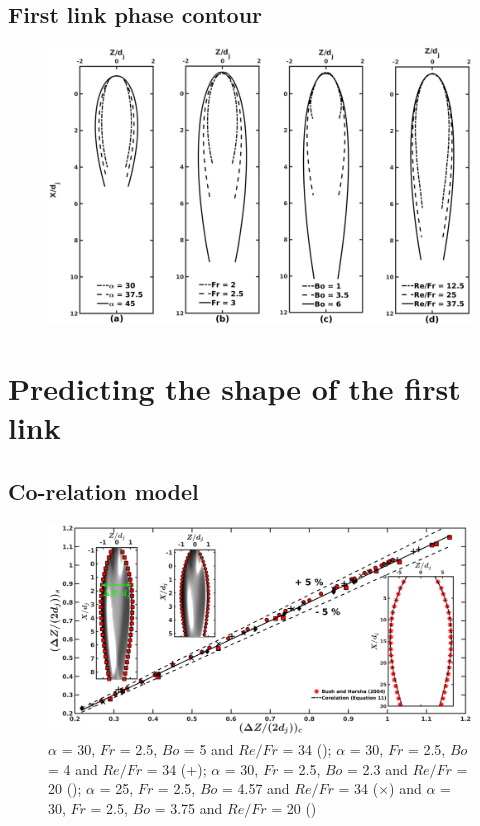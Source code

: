 \documentclass[%
aip,
sd,%
amsmath,amssymb,
preprint,%
author-year,%
]{revtex4-1}
\begin{document}
\subsection{First link phase contour}
\begin{figure}
	\centering
	\includegraphics[width=\linewidth]{finalContour}
	\caption{}
	\label{Figure::finalContours}
\end{figure}
\lipsum
\section{Predicting the shape of the first link}
\lipsum[1]
\subsection{Co-relation model}
\lipsum[1]
\begin{figure}[H]
	\centering
	\includegraphics[width=\linewidth]{corelatehx}
	\caption{$\alpha$ = 30, $Fr$ = 2.5, $Bo$ = 5 and $Re/Fr$ = 34 (\protect\MarkerSquareRed); $\alpha$ = 30, $Fr$ = 2.5, $Bo$ = 4 and $Re/Fr$ = 34 (+); $\alpha$ = 30, $Fr$ = 2.5, $Bo$ = 2.3 and $Re/Fr$ = 20 (\protect \MarkerDiamondBlack); $\alpha$ = 25, $Fr$ = 2.5, $Bo$ = 4.57 and $Re/Fr$ = 34 ($\times$) and $\alpha$ = 30, $Fr$ = 2.5, $Bo$ = 3.75 and $Re/Fr$ = 20 (\protect \MarkerCircleRed) }
	\label{Figure::corelatehx}
\end{figure}
\lipsum
\end{document}
